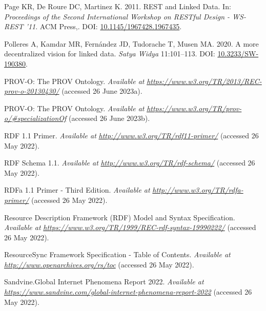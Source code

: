 \begin{CSLReferences}{1}{0}
\leavevmode{}%
Page KR, De Roure DC, Martinez K. 2011. REST and Linked Data. In: \emph{Proceedings of the Second International Workshop on RESTful Design - WS-REST '11}. ACM Press,. DOI: \href{https://doi.org/10.1145/1967428.1967435}{10.1145/1967428.1967435}.

\leavevmode{}%
Polleres A, Kamdar MR, Fernández JD, Tudorache T, Musen MA. 2020. A more decentralized vision for linked data. \emph{Satya Widya} 11:101--113. DOI: \href{https://doi.org/10.3233/SW-190380}{10.3233/SW-190380}.

\leavevmode{}%
PROV-O: The PROV Ontology. \emph{Available at} \href{https://www.w3.org/TR/2013/REC-prov-o-20130430/}{\emph{https://www.w3.org/TR/2013/REC-prov-o-20130430/}} (accessed 26 June 2023a).

\leavevmode{}%
PROV-O: The PROV Ontology. \emph{Available at} \href{https://www.w3.org/TR/prov-o/\#specializationOf}{\emph{https://www.w3.org/TR/prov-o/\#specializationOf}} (accessed 26 June 2023b).

\leavevmode{}%
RDF 1.1 Primer. \emph{Available at} \href{http://www.w3.org/TR/rdf11-primer/}{\emph{http://www.w3.org/TR/rdf11-primer/}} (accessed 26 May 2022).

\leavevmode{}%
RDF Schema 1.1. \emph{Available at} \href{http://www.w3.org/TR/rdf-schema/}{\emph{http://www.w3.org/TR/rdf-schema/}} (accessed 26 May 2022).

\leavevmode{}%
RDFa 1.1 Primer - Third Edition. \emph{Available at} \href{http://www.w3.org/TR/rdfa-primer/}{\emph{http://www.w3.org/TR/rdfa-primer/}} (accessed 26 May 2022).

\leavevmode{}%
Resource Description Framework (RDF) Model and Syntax Specification. \emph{Available at} \href{https://www.w3.org/TR/1999/REC-rdf-syntax-19990222/}{\emph{https://www.w3.org/TR/1999/REC-rdf-syntax-19990222/}} (accessed 26 May 2022).

\leavevmode{}%
ResourceSync Framework Specification - Table of Contents. \emph{Available at} \href{http://www.openarchives.org/rs/toc}{\emph{http://www.openarchives.org/rs/toc}} (accessed 26 May 2022).

\leavevmode{}%
Sandvine.Global Internet Phenomena Report 2022. \emph{Available at} \href{https://www.sandvine.com/global-internet-phenomena-report-2022}{\emph{https://www.sandvine.com/global-internet-phenomena-report-2022}} (accessed 26 May 2022).


\end{CSLReferences}
